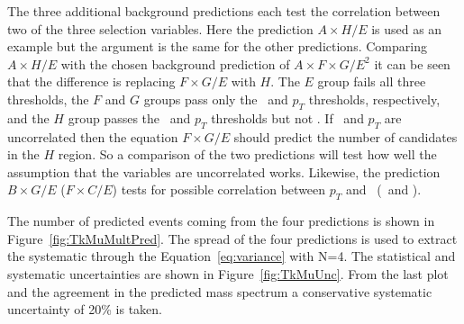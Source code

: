 The three additional background predictions each test the correlation between two of the three selection variables. Here the prediction $A \times H/E$ is used as an example but
the argument is the same for the other predictions. Comparing $A \times H/E$ with the chosen background prediction of $A\times F\times G/E^2$ it can be seen that
the difference is replacing $F\times G/E$ with $H$. The $E$ group fails all three thresholds, the $F$ and $G$ groups pass only the \invbeta\ and $p_T$ thresholds,
respectively, and the $H$ group passes the \invbeta\ and $p_T$ thresholds but not \dedx. If \invbeta\ and $p_T$ are uncorrelated then the equation $F\times G/E$ should
predict the number of candidates in the $H$ region. So a comparison of the two predictions will test how well the assumption that the variables are uncorrelated works.
Likewise, the prediction $B \times G/E$ ($F \times C/E$) tests for possible correlation between $p_T$ and \dedx\ (\invbeta\ and \dedx).

The number of predicted events coming from the four predictions is shown in Figure~\ref{fig:TkMuMultPred}. The spread of the four predictions is used to extract 
the systematic through the Equation~\ref{eq:variance} with N=4. The statistical and systematic uncertainties are shown in Figure~\ref{fig:TkMuUnc}. From the last plot
and the agreement in the predicted mass spectrum a conservative systematic uncertainty of 20\% is taken.

